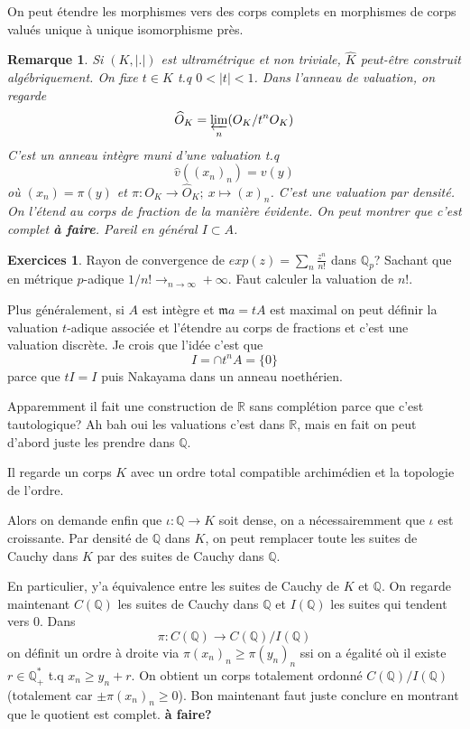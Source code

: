 \documentclass[a4paper,12pt]{book}
\newcommand{\R}{\mathbb{R}}
\newcommand{\Q}{\mathbb{Q}}
\newcommand{\m}{\mathfrak m}
\theoremstyle{plain}
\newtheorem{rem}{Remarque}
\theoremstyle{definition}
\newtheorem{exo}[subsection]{Exercices}
\theoremstyle{remark}
\begin{document}
On peut étendre les morphismes vers des corps complets en morphismes
de corps valués unique à unique isomorphisme près.

\begin{rem}
    Si $(K,|.|)$ est ultramétrique et non triviale, $\hat K$ peut-être
    construit algébriquement. On fixe $t\in K$ t.q $0<|t|<1$. Dans
    l'anneau de valuation, on regarde 
    \[\widehat O_K=\varprojlim_n(O_K/t^nO_K)\]
    C'est un anneau intègre muni d'une valuation t.q
    \[\widehat v((x_n)_n)=v(y)\]
    où $(x_n)=\pi(y)$ et 
    $\pi\colon O_K \to \widehat O_K;~x\mapsto (x)_n$. C'est
    une valuation par densité. On l'étend au corps de fraction de la 
    manière évidente. On peut montrer que c'est complet \textbf{à faire}.
    Pareil en général \textbf{$I\subset A$}.
\end{rem}
\begin{exo}
    Rayon de convergence de $exp(z)=\sum_n \frac{z^n}{n!}$ dans 
    $\Q_p$? Sachant que en métrique $p$-adique 
    $1/n!\to_{n\to\infty}+\infty$. Faut calculer la valuation de 
    $n!$.
\end{exo}
Plus généralement, si $A$ est intègre et $\m a=tA$ est maximal
on peut définir la valuation $t$-adique associée et l'étendre au 
corps de fractions et c'est une valuation discrète. Je crois que l'idée 
c'est que 
\[I=\cap t^n A=\{0\}\]
parce que $tI=I$ puis Nakayama dans un anneau noethérien.

Apparemment il fait une construction de $\R$ sans complétion parce que
c'est tautologique? Ah bah oui les valuations c'est dans $\R$, mais
en fait on peut d'abord juste les prendre dans $\Q$.


Il regarde un corps $K$ avec un ordre total 
compatible archimédien et la topologie de l'ordre.

Alors on demande
enfin que $\iota\colon \Q\to K$ soit dense, on a nécessairemment que
$\iota$ est croissante. Par densité de $\Q$ dans $K$, on peut remplacer
toute les suites de Cauchy dans $K$ par des suites de Cauchy dans $\Q$.


En particulier, y'a équivalence entre les suites de Cauchy de $K$ et 
$\Q$. On regarde maintenant $C(\Q)$ les suites de Cauchy dans $\Q$ et
$I(\Q)$ les suites qui tendent vers $0$. Dans
\[\pi\colon C(\Q)\to C(\Q)/I(\Q)\]
on définit un ordre à droite via $\pi(x_n)_n\geq \pi(y_n)_n$ ssi
on a égalité où il existe $r\in \Q^*_+$ t.q $x_n\geq y_n+r$. On obtient
un corps totalement ordonné $C(\Q)/I(\Q)$ (totalement car 
$\pm\pi(x_n)_n\geq 0$). Bon maintenant faut juste conclure en montrant
que le quotient est complet. \textbf{à faire?}
\end{document}
